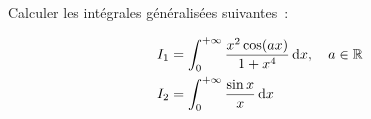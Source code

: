 \begin{exercice}
\label{ex:int_gen}
Calculer les intégrales généralisées suivantes~:

\begin{align*}
I_1 & = \int_0^{+\infty} \frac{x^2 \cos(ax)}{1+x^4} \mathop{}\mathopen{}\mathrm{d} x , \quad a \in
\mathbb{R}\\
I_2 & = \int_0^{+\infty} \frac{ \sin x}{x}\mathop{}\mathopen{}\mathrm{d} x
\end{align*}

\end{exercice}
%
